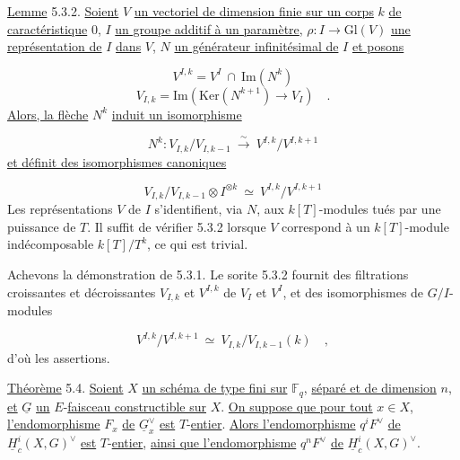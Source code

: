\underline{Lemme} 5.3.2. \underline{Soient} $V$ \underline{un vectoriel de dimension finie sur un corps} $k$ \underline{de caractéristique} $0$, $I$ \underline{un groupe additif à un paramètre}, $\rho : I \longrightarrow \mathrm{Gl}(V)$ \underline{une représentation de} $I$ \underline{dans} $V$, $N$ \underline{un générateur infinitésimal de} $I$ \underline{et posons}

\begin{equation*}
V^{I,k} = V^I \ \cap \ \mathrm{Im}(N^k)
\end{equation*}
\begin{equation*}
V_{I,k} = \mathrm{Im}(\mathrm{Ker}(N^{k+1}) \longrightarrow V_I) \quad .
\end{equation*}
\underline{Alors, la flèche} $N^k$ \underline{induit un isomorphisme}

\begin{equation*}
N^k : V_{I,k}/V_{I,k-1} \ \overset{\sim}{\longrightarrow} \ V^{I,k}/V^{I,k+1}
\end{equation*}
\underline{et définit des isomorphismes canoniques}

\begin{equation*}
V_{I,k}/V_{I,k-1} \otimes I^{\otimes k} \ \simeq \ V^{I,k}/V^{I,k+1}
\end{equation*}
Les représentations $V$ de $I$ s'identifient, via $N$, aux $k[T]$-modules tués par une puissance de $T$. Il suffit de vérifier 5.3.2 lorsque $V$ correspond à un $k[T]$-module indécomposable $k[T]/T^k$, ce qui est trivial.

Achevons la démonstration de 5.3.1. Le sorite 5.3.2 fournit des filtrations croissantes et décroissantes $V_{I,k}$ et $V^{I,k}$ de $V_I$ et $V^I$, et des isomorphismes de $G/I$-modules

\begin{equation*}
V^{I,k}/V^{I,k+1} \ \simeq \ V_{I,k}/V_{I,k-1}(k) \quad ,
\end{equation*}
d'où les assertions.



\underline{Théorème} 5.4. \underline{Soient} $X$ \underline{un schéma de type fini sur} $\mathbb{F}_q$, \underline{séparé et de dimension} $n$, \underline{et} $\underline{G}$ \underline{un} $E$-\underline{faisceau constructible sur} $X$. \underline{On suppose que pour tout} $x \in X$, \underline{l'endomorphisme} $F_x$ \underline{de} $\underline{G}_x^\vee$ \underline{est} $T$-\underline{entier}. \underline{Alors l'endomorphisme} $q^i F^\vee$ \underline{de} $\underline{H}_c^i(X,G)^\vee$ \underline{est} $T$-\underline{entier}, \underline{ainsi que l'endomorphisme} $q^n F^\vee$ \underline{de} $\underline{H}_c^i(X,G)^\vee$.

